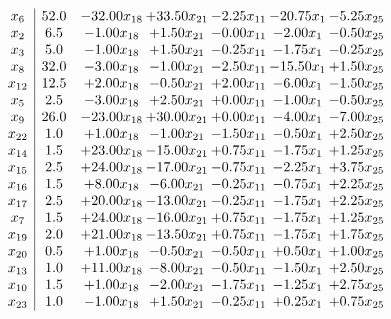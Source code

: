 \documentclass[8pt]{article}
\begin{document}
\[\begin{array}{c| c c@{\hskip 2pt} c@{\hskip 2pt} c@{\hskip 2pt} c@{\hskip 2pt} c@{\hskip 2pt} }
 x_{6}   &  52.0 & -32.00 x_{18} & + 33.50 x_{21} & -2.25 x_{11} & -20.75 x_{1} & -5.25 x_{25}\\
 x_{2}   &  6.5 & -1.00 x_{18} & +  1.50 x_{21} & -0.00 x_{11} & -2.00 x_{1} & -0.50 x_{25}\\
 x_{3}   &  5.0 & -1.00 x_{18} & +  1.50 x_{21} & -0.25 x_{11} & -1.75 x_{1} & -0.25 x_{25}\\
 x_{8}   &  32.0 & -3.00 x_{18} & -1.00 x_{21} & -2.50 x_{11} & -15.50 x_{1} & +  1.50 x_{25}\\
 x_{12}   &  12.5 & +  2.00 x_{18} & -0.50 x_{21} & +  2.00 x_{11} & -6.00 x_{1} & -1.50 x_{25}\\
 x_{5}   &  2.5 & -3.00 x_{18} & +  2.50 x_{21} & +  0.00 x_{11} & -1.00 x_{1} & -0.50 x_{25}\\
 x_{9}   &  26.0 & -23.00 x_{18} & + 30.00 x_{21} & +  0.00 x_{11} & -4.00 x_{1} & -7.00 x_{25}\\
 x_{22}   &  1.0 & +  1.00 x_{18} & -1.00 x_{21} & -1.50 x_{11} & -0.50 x_{1} & +  2.50 x_{25}\\
 x_{14}   &  1.5 & + 23.00 x_{18} & -15.00 x_{21} & +  0.75 x_{11} & -1.75 x_{1} & +  1.25 x_{25}\\
 x_{15}   &  2.5 & + 24.00 x_{18} & -17.00 x_{21} & -0.75 x_{11} & -2.25 x_{1} & +  3.75 x_{25}\\
 x_{16}   &  1.5 & +  8.00 x_{18} & -6.00 x_{21} & -0.25 x_{11} & -0.75 x_{1} & +  2.25 x_{25}\\
 x_{17}   &  2.5 & + 20.00 x_{18} & -13.00 x_{21} & -0.25 x_{11} & -1.75 x_{1} & +  2.25 x_{25}\\
 x_{7}   &  1.5 & + 24.00 x_{18} & -16.00 x_{21} & +  0.75 x_{11} & -1.75 x_{1} & +  1.25 x_{25}\\
 x_{19}   &  2.0 & + 21.00 x_{18} & -13.50 x_{21} & +  0.75 x_{11} & -1.75 x_{1} & +  1.75 x_{25}\\
 x_{20}   &  0.5 & +  1.00 x_{18} & -0.50 x_{21} & -0.50 x_{11} & +  0.50 x_{1} & +  1.00 x_{25}\\
 x_{13}   &  1.0 & + 11.00 x_{18} & -8.00 x_{21} & -0.50 x_{11} & -1.50 x_{1} & +  2.50 x_{25}\\
 x_{10}   &  1.5 & +  1.00 x_{18} & -2.00 x_{21} & -1.75 x_{11} & -1.25 x_{1} & +  2.75 x_{25}\\
 x_{23}   &  1.0 & -1.00 x_{18} & +  1.50 x_{21} & -0.25 x_{11} & +  0.25 x_{1} & +  0.75 x_{25}\\

\end{array}\]
\end{document}
